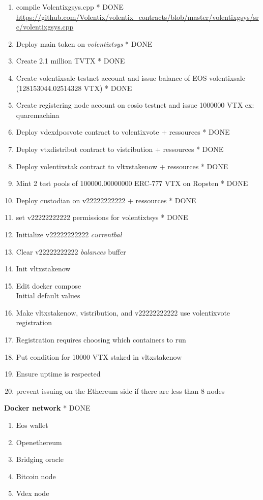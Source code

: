 \documentclass[]{article}
\begin{document}
  		\begin{enumerate}
  			\item compile Volentixgsys.cpp * {\color{green} DONE}\\ 
  			\url{https://github.com/Volentix/volentix_contracts/blob/master/volentixgsys/src/volentixgsys.cpp} 
  		  \item Deploy main token on \textit{volentixtsys} * {\color{green} DONE}
  		  \item Create 2.1 million TVTX * {\color{green} DONE}
  		  \item Create volentixsale testnet account and issue balance of EOS volentixsale (128153044.02514328 VTX) * {\color{green} DONE}
  		   \item Create registering node account on eosio testnet and issue 1000000 VTX ex: quaremachina
  		  \item Deploy vdexdposvote contract to volentixvote + ressources * {\color{green} DONE}
  		  \item Deploy vtxdistribut contract to vistribution + ressources * {\color{green} DONE}
  		  \item Deploy volentixstak  contract to vltxstakenow + ressources * {\color{green} DONE}
 		  \item Mint 2 test pools of 100000.00000000 ERC-777 VTX on Ropsten  * {\color{green} DONE}
		  \item Deploy custodian on v22222222222 + ressources  * {\color{green} DONE}
		  \item set v22222222222 permissions for volentixtsys * {\color{green} DONE}
		  \item Initialize v22222222222 \textit{currentbal}
		  \item Clear v22222222222 \textit{balances} buffer
		  \item Init vltxstakenow
		  \item Edit docker compose\\
		  Initial default values		
		  \item Make vltxstakenow, vistribution, and v22222222222 use volentixvote registration
		  \item Registration requires choosing which containers to run 
		  \item Put condition for 10000 VTX staked in vltxstakenow
		  \item Ensure uptime is respected 
		  \item prevent issuing on the Ethereum side if there are less than 8 nodes
		   
	 \end{enumerate}
   \textbf{Docker network}	  * {\color{green} DONE}
  \begin{enumerate}
  	\item Eos wallet
  	\item Openethereum
  	\item Bridging oracle
  	\item Bitcoin node
  	\item Vdex node
  \end{enumerate}
\end{document}
